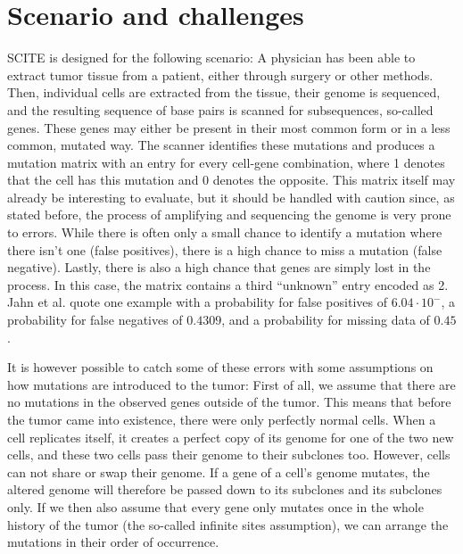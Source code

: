 \section{Scenario and challenges}
\label{sec:scenario}

\ac{SCITE} is designed for the following scenario: A physician has been able to extract tumor tissue from a patient, either through surgery or other methods. Then, individual cells are extracted from the tissue, their genome is sequenced, and the resulting sequence of base pairs is scanned for subsequences, so-called genes. These genes may either be present in their most common form or in a less common, mutated way. The scanner identifies these mutations and produces a mutation matrix with an entry for every cell-gene combination, where 1 denotes that the cell has this mutation and 0 denotes the opposite. This matrix itself may already be interesting to evaluate, but it should be handled with caution since, as stated before, the process of amplifying and sequencing the genome is very prone to errors. While there is often only a small chance to identify a mutation where there isn't one (false positives), there is a high chance to miss a mutation (false negative). Lastly, there is also a high chance that genes are simply lost in the process. In this case, the matrix contains a third ``unknown'' entry encoded as 2. Jahn et al. \cite{tree2016} quote one example with a probability for false positives of $6.04 \cdot 10^{-}$, a probability for false negatives of $0.4309$, and a probability for missing data of $0.45$.

It is however possible to catch some of these errors with some assumptions on how mutations are introduced to the tumor: First of all, we assume that there are no mutations in the observed genes outside of the tumor. This means that before the tumor came into existence, there were only perfectly normal cells. When a cell replicates itself, it creates a perfect copy of its genome for one of the two new cells, and these two cells pass their genome to their subclones too. However, cells can not share or swap their genome. If a gene of a cell's genome mutates, the altered genome will therefore be passed down to its subclones and its subclones only. If we then also assume that every gene only mutates once in the whole history of the tumor (the so-called infinite sites assumption), we can arrange the mutations in their order of occurrence.

